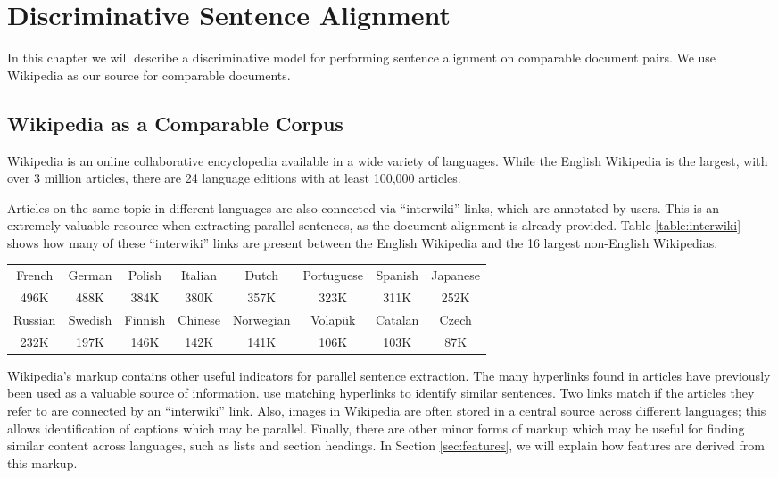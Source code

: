 \chapter{Discriminative Sentence Alignment}
\label{chap:supervised}

In this chapter we will describe a discriminative model for performing sentence
alignment on comparable document pairs. We use Wikipedia as our source for
comparable documents.

\section{Wikipedia as a Comparable Corpus}
\label{sec:wiki}
Wikipedia \citep{wikipedia} is an online collaborative encyclopedia available in
a wide variety of languages.  While the English Wikipedia is the largest, with
over 3 million articles, there are 24 language editions with at least 100,000
articles.

Articles on the same topic in different languages are also connected via
``interwiki'' links, which are annotated by users.  This is an extremely
valuable resource when extracting parallel sentences, as the document alignment
is already provided.  
Table \ref{table:interwiki} shows how
many of these ``interwiki'' links are present between the English Wikipedia and the
16 largest non-English Wikipedias.

\begin{table*}
\begin{center}
\begin{tabular}{|c|c|c|c|c|c|c|c|}
\hline
French & German & Polish & Italian & Dutch & Portuguese & Spanish & Japanese \\
496K & 488K & 384K & 380K & 357K & 323K & 311K & 252K\\
\hline
Russian & Swedish & Finnish & Chinese & Norwegian & Volap\"{u}k & Catalan & Czech \\
232K & 197K & 146K & 142K & 141K & 106K & 103K & 87K\\
\hline
\end{tabular}
\end{center}
\caption{Number of aligned bilingual articles in Wikipedia by language (paired with English).}
\label{table:interwiki}
\end{table*}

Wikipedia's markup contains other useful indicators for parallel sentence
extraction.  The many hyperlinks found in articles have previously been used as
a valuable source of information.  \citep{Adafre06} use matching
hyperlinks to identify similar sentences.  Two links match if the articles they
refer to are connected by an ``interwiki'' link.
Also, images in Wikipedia are often stored in a central source across
different languages; this allows identification of captions which may be
parallel.  Finally, there are other minor forms
of markup which may be useful for finding similar content across languages, such
as lists and section headings.  In Section \ref{sec:features}, we will explain
how features are derived from this markup.

